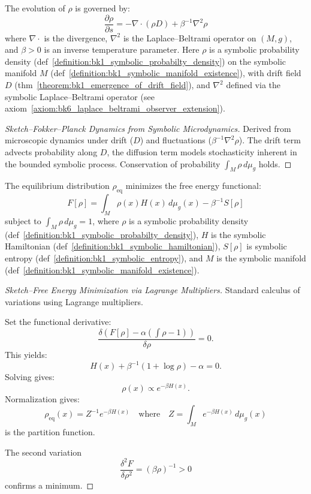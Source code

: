 \begin{theorem}
\label{theorem:bk1_fundamental_relation_fokker_plank_equation}
The evolution of $\rho$ is governed by:
\[
\frac{\partial \rho}{\partial s} = -\nabla \cdot (\rho D) + \beta^{-1} \nabla^2 \rho
\]
where $\nabla \cdot$ is the divergence, $\nabla^2$ is the Laplace–Beltrami operator on $(M,g)$, and $\beta > 0$ is an inverse temperature parameter. Here $\rho$ is a symbolic probability density (def~\ref{definition:bk1_symbolic_probabilty_density}) on the symbolic manifold $M$ (def~\ref{definition:bk1_symbolic_manifold_existence}), with drift field $D$ (thm~\ref{theorem:bk1_emergence_of_drift_field}), and $\nabla^2$ defined via the symbolic Laplace–Beltrami operator (see axiom~\ref{axiom:bk6_laplace_beltrami_observer_extension}).

\begin{proof}[Sketch–Fokker–Planck Dynamics from Symbolic Microdynamics]
\label{proof:bk1_sketch_fokker_planck_microdynamics}
Derived from microscopic dynamics under drift ($D$) and fluctuations ($\beta^{-1} \nabla^2 \rho$). The drift term advects probability along $D$, the diffusion term models stochasticity inherent in the bounded symbolic process. Conservation of probability $\int_M \rho \, d\mu_g$ holds.
\end{proof}
\end{theorem}

\begin{theorem}
\label{theorem:bk1_variational_principle}
The equilibrium distribution $\rho_{\text{eq}}$ minimizes the free energy functional:
\[
F[\rho] = \int_M \rho(x) H(x) \, d\mu_g(x) - \beta^{-1} S[\rho]
\]
subject to $\int_M \rho \, d\mu_g = 1$, where $\rho$ is a symbolic probability density (def~\ref{definition:bk1_symbolic_probabilty_density}), $H$ is the symbolic Hamiltonian (def~\ref{definition:bk1_symbolic_hamiltonian}), $S[\rho]$ is symbolic entropy (def~\ref{definition:bk1_symbolic_entropy}), and $M$ is the symbolic manifold (def~\ref{definition:bk1_symbolic_manifold_existence}).

\begin{proof}[Sketch–Free Energy Minimization via Lagrange Multipliers]
\label{proof:bk1_sketch_lagrange_free_energy}
Standard calculus of variations using Lagrange multipliers.

Set the functional derivative:
\[
\frac{\delta \left(F[\rho] - \alpha \left(\int \rho - 1\right)\right)}{\delta \rho} = 0.
\]
This yields:
\[
H(x) + \beta^{-1}(1 + \log \rho) - \alpha = 0.
\]
Solving gives:
\[
\rho(x) \propto e^{-\beta H(x)}.
\]
Normalization gives:
\[
\rho_{\text{eq}}(x) = Z^{-1} e^{-\beta H(x)} \quad \text{where} \quad Z = \int_M e^{-\beta H(x)} \, d\mu_g(x)
\]
is the partition function.

The second variation
\[
\frac{\delta^2 F}{\delta \rho^2} = (\beta \rho)^{-1} > 0
\]
confirms a minimum.
\end{proof}
\end{theorem}

